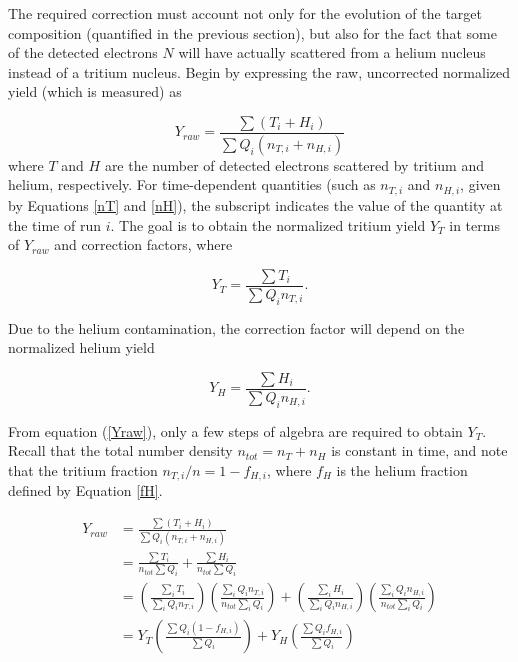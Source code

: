 The required correction must account not only for the evolution of the target composition (quantified in the previous section), but also for the fact that some of the detected electrons $N$ will have actually scattered from a helium nucleus instead of a tritium nucleus.  Begin by expressing the raw, uncorrected normalized yield (which is measured) as

\begin{equation}
Y_{raw} = \frac{\sum (T_i + H_i)}{\sum Q_i (n_{T,i} + n_{H,i})} \label{Yraw}
\end{equation}
where $T$ and $H$ are the number of detected electrons scattered by tritium and helium, respectively.  For time-dependent quantities (such as $n_{T,i}$ and $n_{H,i}$, given by Equations \ref{nT} and \ref{nH}), the subscript indicates the value of the quantity at the time of run $i$.  The goal is to obtain the normalized tritium yield $Y_T$ in terms of $Y_{raw}$ and correction factors, where

\begin{equation}
Y_T = \frac{\sum T_i}{\sum Q_i n_{T,i}}. 
\end{equation} 

Due to the helium contamination, the correction factor will depend on the normalized helium yield

\begin{equation}
Y_H = \frac{\sum H_i}{\sum Q_i n_{H,i}}. 
\end{equation}

From equation (\ref{Yraw}), only a few steps of algebra are required to obtain $Y_T$.  Recall that the total number density $n_{tot}=n_T + n_H$ is constant in time, and note that the tritium fraction $n_{T,i}/n = 1 - f_{H,i}$, where $f_H$ is the helium fraction defined by Equation \ref{fH}.

\begin{align*}
Y_{raw} 	&= \frac{\sum (T_i + H_i)}{\sum Q_i (n_{T,i} + n_{H,i})} \\[15pt]
		&= \frac{\sum T_i}{n_{tot} \sum Q_i} + \frac{\sum H_i}{n_{tot} \sum Q_i} \\[15pt]
		&= \left(\frac{\sum_i T_i}{\sum_i Q_i n_{T,i}}\right)\left(\frac{\sum_i Q_i n_{T,i}}{n_{tot} \sum_i Q_i}\right)
		+ \left(\frac{\sum_i H_i}{\sum_i Q_i n_{H,i}}\right)\left(\frac{\sum_i Q_i n_{H,i}}{n_{tot} \sum_i Q_i}\right) \\[15pt]
		&= Y_T\left(\frac{\sum Q_i(1-f_{H,i})}{\sum Q_i}\right) + Y_H\left(\frac{\sum Q_i f_{H,i}}{\sum Q_i}\right)
\end{align*}

